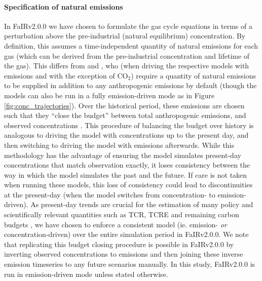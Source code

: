 \documentclass[gmd, manuscript]{copernicus}
\begin{document}
\paragraph*{Specification of natural emissions}
In FaIRv2.0.0 we have chosen to formulate the gas cycle equations in terms of a perturbation above the pre-industrial (natural equilibrium) concentration. By definition, this assumes a time-independent quantity of natural emissions for each gas (which can be derived from the pre-industrial concentration and lifetime of the gas). This differs from \cite{Meinshausen2011} and \cite{Smith2018}, who (when driving the respective models with emissions and with the exception of CO$_2$) require a quantity of natural emissions to be supplied in addition to any anthropogenic emissions by default (though the models can also be run in a fully emission-driven mode as in Figure \ref{fig:conc_trajectories}). Over the historical period, these emissions are chosen such that they ``close the budget'' between total anthropogenic emissions, and observed concentrations \citep{Meinshausen2011,Smith2018}. This procedure of balancing the budget over history is analogous to driving the model with concentrations up to the present day, and then switching to driving the model with emissions afterwards. While this methodology has the advantage of ensuring the model simulates present-day concentrations that match observation exactly, it loses consistency between the way in which the model simulates the past and the future. If care is not taken when running these models, this loss of consistency could lead to discontinuities at the present-day (when the model switches from concentration- to emission-driven). As present-day trends are crucial for the estimation of many policy and scientifically relevant quantities such as TCR, TCRE and remaining carbon budgets \citep{Leach2018,Tokarska2020a,Jimenez-de-la-Cuesta2019}, we have chosen to enforce a consistent model (ie. emission- \emph{or} concentration-driven) over the entire simulation period in FaIRv2.0.0. We note that replicating this budget closing procedure is possible in FaIRv2.0.0 by inverting observed concentrations to emissions and then joining these inverse emission timeseries to any future scenarios manually. In this study, FaIRv2.0.0 is run in emission-driven mode unless stated otherwise.
%
\end{document}
